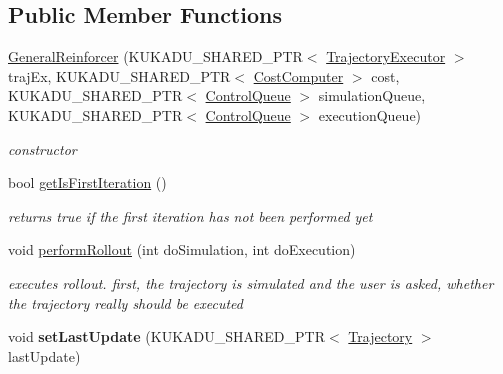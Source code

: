 \subsection*{Public Member Functions}
\begin{DoxyCompactItemize}
\item 
\hyperlink{classkukadu_1_1GeneralReinforcer_a1de3f2b46e82b37454f8095701992c8d}{General\-Reinforcer} (K\-U\-K\-A\-D\-U\-\_\-\-S\-H\-A\-R\-E\-D\-\_\-\-P\-T\-R$<$ \hyperlink{classkukadu_1_1TrajectoryExecutor}{Trajectory\-Executor} $>$ traj\-Ex, K\-U\-K\-A\-D\-U\-\_\-\-S\-H\-A\-R\-E\-D\-\_\-\-P\-T\-R$<$ \hyperlink{classkukadu_1_1CostComputer}{Cost\-Computer} $>$ cost, K\-U\-K\-A\-D\-U\-\_\-\-S\-H\-A\-R\-E\-D\-\_\-\-P\-T\-R$<$ \hyperlink{classkukadu_1_1ControlQueue}{Control\-Queue} $>$ simulation\-Queue, K\-U\-K\-A\-D\-U\-\_\-\-S\-H\-A\-R\-E\-D\-\_\-\-P\-T\-R$<$ \hyperlink{classkukadu_1_1ControlQueue}{Control\-Queue} $>$ execution\-Queue)
\begin{DoxyCompactList}\small\item\em constructor \end{DoxyCompactList}\item 
\hypertarget{classkukadu_1_1GeneralReinforcer_aa384f66bcf7487b449dc67c768e86f5e}{bool \hyperlink{classkukadu_1_1GeneralReinforcer_aa384f66bcf7487b449dc67c768e86f5e}{get\-Is\-First\-Iteration} ()}\label{classkukadu_1_1GeneralReinforcer_aa384f66bcf7487b449dc67c768e86f5e}

\begin{DoxyCompactList}\small\item\em returns true if the first iteration has not been performed yet \end{DoxyCompactList}\item 
void \hyperlink{classkukadu_1_1GeneralReinforcer_aee9cbeaac91379e1926088150f9c5063}{perform\-Rollout} (int do\-Simulation, int do\-Execution)
\begin{DoxyCompactList}\small\item\em executes rollout. first, the trajectory is simulated and the user is asked, whether the trajectory really should be executed \end{DoxyCompactList}\item 
\hypertarget{classkukadu_1_1GeneralReinforcer_a0fe9f486ada94bb1eeeb6e460da5579f}{void {\bfseries set\-Last\-Update} (K\-U\-K\-A\-D\-U\-\_\-\-S\-H\-A\-R\-E\-D\-\_\-\-P\-T\-R$<$ \hyperlink{classkukadu_1_1Trajectory}{Trajectory} $>$ last\-Update)}\label{classkukadu_1_1GeneralReinforcer_a0fe9f486ada94bb1eeeb6e460da5579f}


\end{DoxyCompactItemize}
